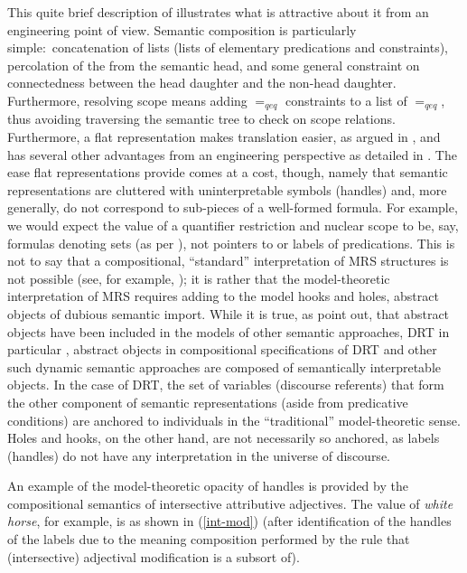 \documentclass[output=paper
 	        ,biblatex
                ,babelshorthands
                ,newtxmath
                ,draftmode
                ,colorlinks, citecolor=brown
]{langscibook}
\begin{document}
This quite brief description of  illustrates what is attractive about it from an engineering point of view. Semantic composition is particularly simple:\ concatenation of lists (lists of elementary predications and constraints), percolation of the  from the semantic head, and some general constraint on connectedness between the head daughter and the non-head daughter. Furthermore, resolving scope means adding $=_{qeq}$ constraints to a list of $=_{qeq}$, thus avoiding traversing the semantic tree to check on scope relations. Furthermore, a flat representation makes translation easier, as argued in \citet{Copestakeetal1995}, and has several other advantages from an engineering perspective as detailed in \citet{Copestake2009}. The ease flat representations provide comes at a cost, though, namely that semantic representations are cluttered with uninterpretable symbols (handles) and, more generally, do not correspond to sub-pieces of a well-formed formula. For example, we would expect the value of a quantifier restriction and nuclear scope to be, say, formulas denoting sets (as per \citealt{BarwiseandCooper1981}), not pointers to or labels of predications. This is not to say that a compositional, ``standard'' interpretation of MRS structures is not possible (see, for example, \citealt{Copestakeetal2001}); it is rather that the model-theoretic interpretation of MRS requires adding to the model hooks and holes, abstract objects of dubious semantic import. While it is true, as \citeauthor{Copestakeetal2005} point out, that abstract objects have been included in the models of other semantic approaches, DRT in particular \citep{Zeevat1989}, abstract objects in compositional specifications of DRT and other such dynamic semantic approaches are composed of semantically interpretable objects. In the case of DRT, the set of variables (discourse referents) that form the other component of semantic representations (aside from predicative conditions) are anchored to individuals in the ``traditional'' model-theoretic sense. Holes and hooks, on the other hand, are not necessarily so anchored, as labels (handles) do not have any interpretation in the universe of discourse.


An example of the model-theoretic opacity of handles is provided by the compositional semantics of intersective attributive adjectives. The  value of \emph{white horse}, for example, is as shown in (\ref{int-mod}) (after identification of the handles of the labels due to the meaning composition performed by the  rule that (intersective) adjectival modification is a subsort of).
\end{document}
